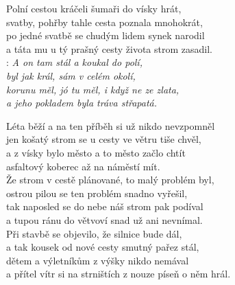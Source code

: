 
Polní cestou kráčeli šumaři do vísky hrát,\\
svatby, pohřby tahle cesta poznala mnohokrát,\\
po jedné svatbě se chudým lidem synek narodil\\
a táta mu u tý prašný cesty života strom zasadil.\\

\textregistered: \emph{A on tam stál a koukal do polí,\\
byl jak král, sám v celém okolí,\\
korunu měl, jó tu měl, i když ne ze zlata,\\
a jeho pokladem byla tráva střapatá.}\\

\begin{Large}

Léta běží a na ten příběh si už nikdo nevzpomněl\\
jen košatý strom se u cesty ve větru tiše chvěl,\\
a z vísky bylo město a to město začlo chtít\\
asfaltový koberec až na náměstí mít. \textregistered\\

Že strom v cestě plánované, to malý problém byl,\\
ostrou pilou se ten problém snadno vyřešil,\\
tak naposled se do nebe náš strom pak podíval\\
a tupou ránu do větvoví snad už ani nevnímal. \textregistered\\

Při stavbě se objevilo, že silnice bude dál,\\
a tak kousek od nové cesty smutný pařez stál,\\
dětem a výletníkům z výšky nikdo nemával\\
a přítel vítr si na strništích z nouze píseň o něm hrál. \textregistered

\end{Large}

\newpage
